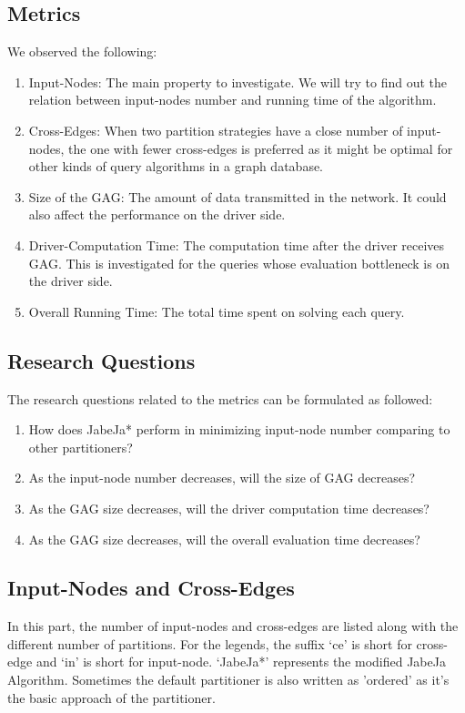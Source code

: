 \subsection{Metrics}
We observed the following:
\begin{enumerate}
    \item Input-Nodes: The main property to investigate. We will try to find out the relation between input-nodes number and running time of the algorithm.
    \item Cross-Edges: When two partition strategies have a close number of input-nodes, the one with fewer cross-edges is preferred as it might be optimal for other kinds of query algorithms in a graph database.
    \item Size of the GAG: The amount of data transmitted in the network. It could also affect the performance on the driver side.
    \item Driver-Computation Time: The computation time after the driver receives GAG. This is investigated for the queries whose evaluation bottleneck is on the driver side.
    \item Overall Running Time: The total time spent on solving each query.
\end{enumerate}

\subsection{Research Questions}
The research questions related to the metrics can be formulated as followed:
\begin{enumerate}
    \item How does JabeJa* perform in minimizing input-node number comparing to other partitioners?
    \item As the input-node number decreases, will the size of GAG decreases?
    \item As the GAG size decreases, will the driver computation time decreases?
    \item As the GAG size decreases, will the overall evaluation time decreases?
\end{enumerate}

\subsection{Input-Nodes and Cross-Edges}
In this part, the number of input-nodes and cross-edges are listed along with the different number of partitions. For the legends, the suffix `ce' is short for cross-edge and `in' is short for input-node. `JabeJa*' represents the modified JabeJa Algorithm. Sometimes the default partitioner is also written as 'ordered' as it's the basic approach of the partitioner.
